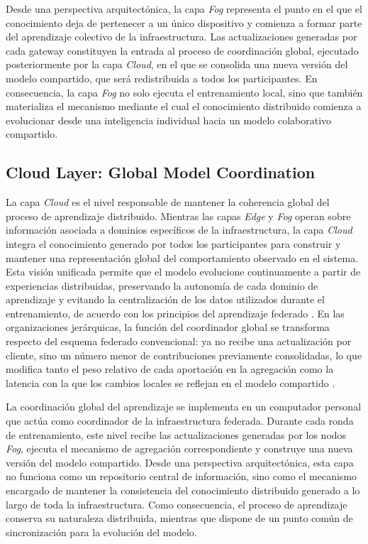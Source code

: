 \documentclass[journal,article,submit,moreauthors]{Definitions/mdpi}
\begin{document}
Desde una perspectiva arquitectónica, la capa \textit{Fog} representa el punto en el que el conocimiento deja de pertenecer a un único dispositivo y comienza a formar parte del aprendizaje colectivo de la infraestructura. Las actualizaciones generadas por cada gateway constituyen la entrada al proceso de coordinación global, ejecutado posteriormente por la capa \textit{Cloud}, en el que se consolida una nueva versión del modelo compartido, que será redistribuida a todos los participantes. En consecuencia, la capa \textit{Fog} no solo ejecuta el entrenamiento local, sino que también materializa el mecanismo mediante el cual el conocimiento distribuido comienza a evolucionar desde una inteligencia individual hacia un modelo colaborativo compartido.

\subsection{Cloud Layer: Global Model Coordination}
La capa \textit{Cloud} es el nivel responsable de mantener la coherencia global del proceso de aprendizaje distribuido. Mientras las capas \textit{Edge} y \textit{Fog} operan sobre información asociada a dominios específicos de la infraestructura, la capa \textit{Cloud} integra el conocimiento generado por todos los participantes para construir y mantener una representación global del comportamiento observado en el sistema. Esta visión unificada permite que el modelo evolucione continuamente a partir de experiencias distribuidas, preservando la autonomía de cada dominio de aprendizaje y evitando la centralización de los datos utilizados durante el entrenamiento, de acuerdo con los principios del aprendizaje federado \cite{McMahan2017,Imteaj2022,Ramadan2025}. En las organizaciones jerárquicas, la función del coordinador global se transforma respecto del esquema federado convencional: ya no recibe una actualización por cliente, sino un número menor de contribuciones previamente consolidadas, lo que modifica tanto el peso relativo de cada aportación en la agregación como la latencia con la que los cambios locales se reflejan en el modelo compartido \cite{Ma2024,Dritsas2025}.

La coordinación global del aprendizaje se implementa en un computador personal que actúa como coordinador de la infraestructura federada. Durante cada ronda de entrenamiento, este nivel recibe las actualizaciones generadas por los nodos \textit{Fog}, ejecuta el mecanismo de agregación correspondiente y construye una nueva versión del modelo compartido. Desde una perspectiva arquitectónica, esta capa no funciona como un repositorio central de información, sino como el mecanismo encargado de mantener la consistencia del conocimiento distribuido generado a lo largo de toda la infraestructura. Como consecuencia, el proceso de aprendizaje conserva su naturaleza distribuida, mientras que dispone de un punto común de sincronización para la evolución del modelo.
\end{document}
